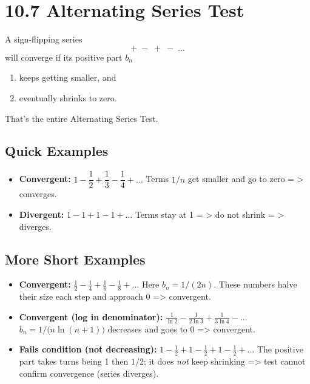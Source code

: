 \documentclass{article}
\begin{document}
\newpage
\section{10.7 Alternating Series Test}

\begin{tcolorbox}[colback=gray!8,colframe=black,title=Big-Idea (plain words)]
A sign-flipping series 
\[
+\;-\;+\;-\;\dots
\]
will converge if its positive part \(b_n\)

\begin{enumerate}[itemsep=2pt]
  \item keeps getting smaller, and
  \item eventually shrinks to zero.
\end{enumerate}
That’s the entire Alternating Series Test.
\end{tcolorbox}

\subsection*{Quick Examples}

\begin{itemize}[itemsep=10pt]

  \item \textbf{Convergent:}\; \(1 - \dfrac12 + \dfrac13 - \dfrac14 + \dots\)  
        Terms \(1/n\) get smaller and go to zero = > converges.

  \item \textbf{Divergent:}\; \(1 - 1 + 1 - 1 + \dots\)  
        Terms stay at 1 = > do not shrink  = > diverges.

\end{itemize}

\subsection*{More Short Examples}

\begin{itemize}[itemsep=10pt]

  \item \textbf{Convergent:}\;
        \(\displaystyle \frac{1}{2} - \frac{1}{4} + \frac{1}{6} - \frac{1}{8} + \dots\)  
        Here \(b_n = 1/(2n)\).  These numbers halve their size each step and
        approach 0 => convergent.

  \item \textbf{Convergent (log in denominator):}\;
        \(\displaystyle \frac{1}{\ln 2} - \frac{1}{2\ln 3} + \frac{1}{3\ln 4} - \dots\)  
        \(b_n = 1\!\big/\!\bigl(n\ln(n+1)\bigr)\) decreases and goes to 0 => convergent.

  \item \textbf{Fails condition (not decreasing):}\;
        \(\displaystyle 1 - \frac{1}{2} + 1 - \frac{1}{2} + 1 - \frac{1}{2} + \dots\)  
        The positive part takes turns being 1 then \(1/2\); it does \emph{not}
        keep shrinking => test cannot confirm convergence (series diverges).

\end{itemize}
\end{document}
